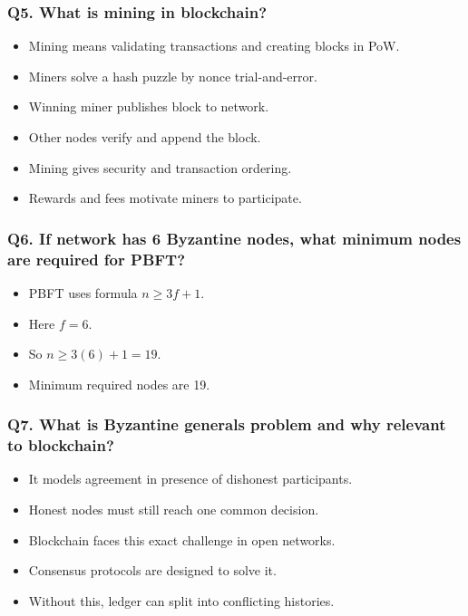 \documentclass[12pt,a4paper]{article}
\begin{document}
\subsubsection*{Q5. What is mining in blockchain?}
\begin{itemize}
\item Mining means validating transactions and creating blocks in PoW.
\item Miners solve a hash puzzle by nonce trial-and-error.
\item Winning miner publishes block to network.
\item Other nodes verify and append the block.
\item Mining gives security and transaction ordering.
\item Rewards and fees motivate miners to participate.
\end{itemize}

\subsubsection*{Q6. If network has 6 Byzantine nodes, what minimum nodes are required for PBFT?}
\begin{itemize}
\item PBFT uses formula $n \ge 3f+1$.
\item Here $f=6$.
\item So $n \ge 3(6)+1=19$.
\item Minimum required nodes are 19.
\end{itemize}

\subsubsection*{Q7. What is Byzantine generals problem and why relevant to blockchain?}
\begin{itemize}
\item It models agreement in presence of dishonest participants.
\item Honest nodes must still reach one common decision.
\item Blockchain faces this exact challenge in open networks.
\item Consensus protocols are designed to solve it.
\item Without this, ledger can split into conflicting histories.
\end{itemize}
\end{document}
